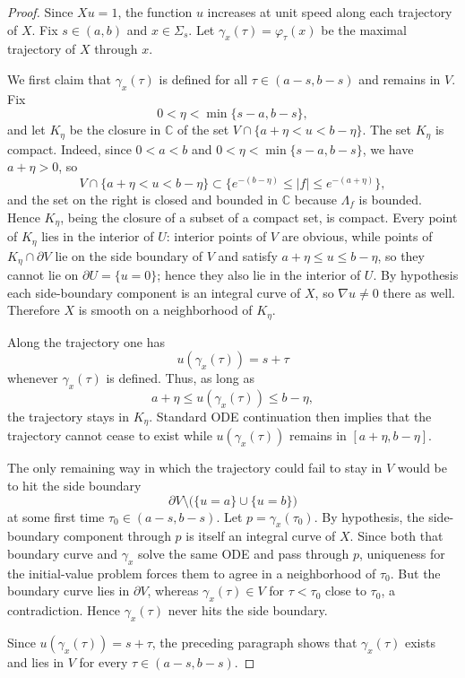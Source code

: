 \documentclass[12pt]{amsart}
\theoremstyle{definition}
\theoremstyle{remark}
\begin{document}
\begin{proof} Since $Xu=1$, the function $u$ increases at unit speed along each trajectory of $X$. Fix $s\in(a,b)$
and $x\in\Sigma_s$. Let $\gamma_x(\tau)=\varphi_\tau(x)$ be the maximal trajectory of $X$ through $x$.

\indent We first claim that $\gamma_x(\tau)$ is defined for all $\tau\in(a-s,b-s)$ and remains in $V$. Fix
\[
 0<\eta<\min\{s-a,b-s\},
\]
and let $K_\eta$ be the closure in $\mathbb{C}$ of the set $V\cap\{a+\eta<u<b-\eta\}$. The set $K_\eta$ is compact. Indeed,
since $0<a<b$ and $0<\eta<\min\{s-a,b-s\}$, we have $a+\eta>0$, so
\[
V\cap\{a+\eta<u<b-\eta\}\subset \{e^{-(b-\eta)}\le |f|\le e^{-(a+\eta)}\},
\]
and the set on the right is closed and bounded in $\mathbb{C}$ because $\Lambda_f$ is bounded. Hence $K_\eta$, being
the closure of a subset of a compact set, is compact. Every point of $K_\eta$ lies in the interior of $U$:
interior points of $V$ are obvious, while points of $K_\eta\cap\partial V$ lie on the side boundary of $V$ and satisfy
$a+\eta\le u\le b-\eta$, so they cannot lie on $\partial U=\{u=0\}$; hence they also lie in the interior of $U$.
By hypothesis each side-boundary component is an integral curve of $X$, so $\nabla u\neq 0$ there as well.
Therefore $X$ is smooth on a neighborhood of $K_\eta$.

\indent Along the trajectory one has
\[
 u(\gamma_x(\tau))=s+\tau
\]
whenever $\gamma_x(\tau)$ is defined. Thus, as long as
\[
 a+\eta\le u(\gamma_x(\tau))\le b-\eta,
\]
the trajectory stays in $K_\eta$. Standard ODE continuation then implies that the trajectory cannot
cease to exist while $u(\gamma_x(\tau))$ remains in $[a+\eta,b-\eta]$.

\indent The only remaining way in which the trajectory could fail to stay in $V$ would be to hit the side
boundary
\[
\partial V\setminus \bigl(\{u=a\}\cup\{u=b\}\bigr)
\]
at some first time $\tau_0\in(a-s,b-s)$. Let $p=\gamma_x(\tau_0)$. By hypothesis, the side-boundary component
through $p$ is itself an integral curve of $X$. Since both that boundary curve and $\gamma_x$ solve the same ODE
and pass through $p$, uniqueness for the initial-value problem forces them to agree in a neighborhood
of $\tau_0$. But the boundary curve lies in $\partial V$, whereas $\gamma_x(\tau)\in V$ for $\tau<\tau_0$ close to $\tau_0$,
a contradiction. Hence $\gamma_x(\tau)$ never hits the side boundary.

\indent Since $u(\gamma_x(\tau))=s+\tau$, the preceding paragraph shows that $\gamma_x(\tau)$ exists and lies in $V$
for every $\tau\in(a-s,b-s)$.


\end{proof}
\end{document}
